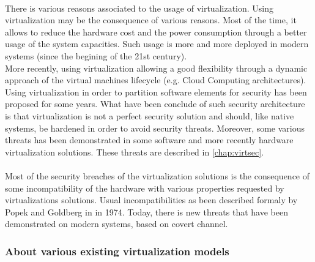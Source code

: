 \paragraph{}
There is various reasons associated to the usage of virtualization.
Using virtualization may be the consequence of various reasons. Most of the time, it allows to
reduce the hardware cost and the power consumption through a better usage of the system capacities.
Such usage is more and more deployed in modern systems (since the begining of the 21st century).\\
More recently, using virtualization allowing a good flexibility through a dynamic approach of the
virtual machines lifecycle (e.g. Cloud Computing architectures).\\
Using virtualization in order to partition software elements for security has been proposed for
some years. What have been conclude of such security architecture is that virtualization is not a
perfect security solution and should, like native systems, be hardened in order to avoid security
threats. Moreover, some various threats has been demonstrated in some software and more recently
hardware virtualization solutions. These threats are described in \ref{chap:virtsec}.

\paragraph{}
Most of the security breaches of the virtualization solutions is the consequence of some
incompatibility of the hardware with various properties requested by virtualizations solutions.
Usual incompatibilities as been described formaly by Popek and Goldberg in \cite{popek} in 1974.
Today, there is new threats that have been demonstrated on modern systems, based on covert channel.

\subsubsection{About various existing virtualization models}

